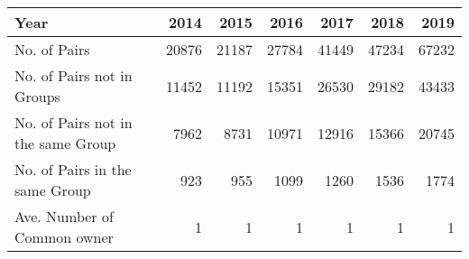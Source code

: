 \begin{tabular}{lrrrrrr}
\toprule
Year &   2014 &   2015 &   2016 &   2017 &   2018 &   2019 \\
\midrule
No. of Pairs                       &  20876 &  21187 &  27784 &  41449 &  47234 &  67232 \\
No. of Pairs not in Groups         &  11452 &  11192 &  15351 &  26530 &  29182 &  43433 \\
No. of Pairs not in the same Group &   7962 &   8731 &  10971 &  12916 &  15366 &  20745 \\
No. of Pairs in the same Group     &    923 &    955 &   1099 &   1260 &   1536 &   1774 \\
Ave. Number of Common owner        &      1 &      1 &      1 &      1 &      1 &      1 \\
\bottomrule
\end{tabular}
